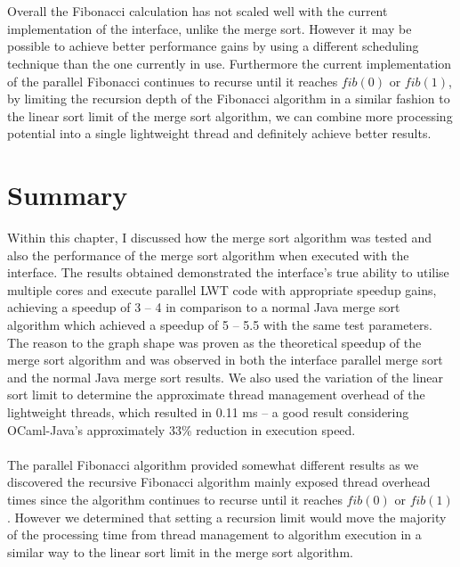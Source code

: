 \documentclass[12pt,twoside,notitlepage]{report}
\begin{document}
%
%

%
%
\hfill\\
\hfill\\
Overall the Fibonacci calculation has not scaled well with the current implementation of the interface, unlike the merge sort. However it may be possible to achieve better performance gains by using a different scheduling technique
than the one currently in use. Furthermore the current implementation of the parallel Fibonacci continues to recurse until it reaches $fib(0)$ or $fib(1)$, by limiting the recursion depth of the Fibonacci algorithm in a similar
fashion to the linear sort limit of the merge sort algorithm, we can combine more processing potential into a single lightweight thread and definitely achieve better results.

\section{Summary}
Within this chapter, I discussed how the merge sort algorithm was tested and also the performance of the merge sort algorithm when executed with the interface. The results obtained demonstrated the interface's true ability to utilise
multiple cores and execute parallel LWT code with appropriate speedup gains, achieving a speedup of 3 -- 4 in comparison to a normal Java merge sort algorithm which achieved a speedup of 5 -- 5.5 with the same test parameters. The
reason to the graph shape was proven as the theoretical speedup of the merge sort algorithm and was observed in both the interface parallel merge sort and the normal Java merge sort results. We also used the variation of the linear
sort limit to determine the approximate thread management overhead of the lightweight threads, which resulted in 0.11 ms -- a good result considering OCaml-Java's approximately 33\% reduction in execution speed.
\hfill\\
\hfill\\
The parallel Fibonacci algorithm provided somewhat different results as we discovered the recursive Fibonacci algorithm mainly exposed thread overhead times since the algorithm continues to recurse until it reaches $fib(0)$ or
$fib(1)$. However we determined that setting a recursion limit would move the majority of the processing time from thread management to algorithm execution in a similar way to the linear sort limit in the merge sort algorithm.
\end{document}

